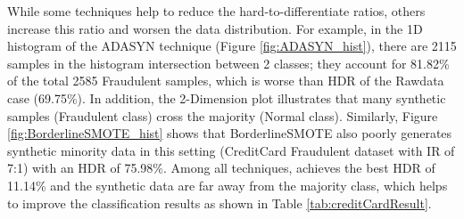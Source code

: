 While some techniques help to reduce the hard-to-differentiate ratios, others increase this ratio and worsen the data distribution. For example, in the 1D histogram of the ADASYN technique (Figure \ref{fig:ADASYN_hist}), there are 2115 samples in the histogram intersection between 2 classes; they account for 81.82\% of the total 2585 Fraudulent samples, which is worse than HDR of the Rawdata case (69.75\%). In addition, the 2-Dimension plot illustrates that many synthetic samples (Fraudulent class) cross the majority (Normal class). Similarly, Figure \ref{fig:BorderlineSMOTE_hist} shows that BorderlineSMOTE also poorly generates synthetic minority data in this setting (CreditCard Fraudulent dataset with IR of 7:1) with an HDR of 75.98\%. Among all techniques, \Methodname{} achieves the best HDR of 11.14\% and the synthetic data are far away from the majority class, which helps to improve the classification results as shown in Table \ref{tab:creditCardResult}.

